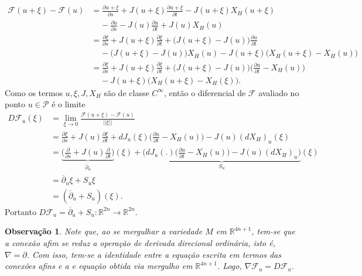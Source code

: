 \documentclass[12pt]{book}
\newtheorem{observacao}[teorema]{Observação}
\newcommand{\bigparenteses}[1]{\Big( #1 \Big) }
\newcommand{\caminhosexponenciaisconectantesabrev}{\mathcal{P}}
\newcommand{\campohamiltoniano}[1]{X_{H}(#1)}
\newcommand{\diferencialfloer}{D\operadorFloer}
\newcommand{\derivadaparcial}[2]{\frac{\partial #1}{\partial #2}}
\newcommand{\diferencialhamiltoniano}[1]{(dX_{H})_{#1}}
\newcommand{\operadorFloer}{\mathcal{F}}
\newcommand{\operadorFloerDefinicao}[1]{\derivadaparcial{#1}{s} + J(#1)\derivadaparcial{#1}{t} - J(#1)X_{H}(#1)}
\newcommand{\operadorFloerParametro}[1]{\mathcal{F}(#1)}
\newcommand{\norma}[1]{||#1||}
\newcommand{\operadorcauchyabrev}[1]{\overline{\partial}_{#1}}
\newcommand{\real}[1]{\mathbb{R}^{#1}}
\begin{document}
	$$
	\begin{aligned}
	\operadorFloerParametro{u+\xi}-\operadorFloerParametro{u}
	&= \operadorFloerDefinicao{u+\xi}
	\\
	&\;\;\;\; -\derivadaparcial{u}{s} - J(u)\derivadaparcial{u}{t} + J(u)\campohamiltoniano{u}
	\\
	&=\derivadaparcial{\xi}{s}+J(u+\xi)\derivadaparcial{\xi}{t}+\bigparenteses{J(u+\xi)-J(u)}\derivadaparcial{u}{t}
	\\
	&\;\;\;\;-\bigparenteses{J(u+\xi)-J(u)}\campohamiltoniano{u} 
	-J(u+\xi)\bigparenteses{\campohamiltoniano{u+\xi}-\campohamiltoniano{u}}
	\\
	&=\derivadaparcial{\xi}{s} + J(u+\xi)\derivadaparcial{\xi}{t} + \bigparenteses{J(u+\xi)-J(u)}\bigparenteses{\derivadaparcial{u}{t} - X_{H}(u)}  
	\\
	&\;\;\;\; -J(u+\xi)\bigparenteses{X_{H}(u+\xi) - X_{H}(\xi)}.
	\end{aligned}
	$$
	Como os termos $u, \xi, J, X_{H}$ são de classe $C^{\infty}$, então o diferencial de $\operadorFloer$ avaliado no ponto $u\in \caminhosexponenciaisconectantesabrev$ é o limite 
	$$
	\begin{aligned}
	\diferencialfloer_{u}(\xi)
	&=\lim_{\xi \to 0} \frac{	\operadorFloerParametro{u+\xi}-\operadorFloerParametro{u}}{\norma{\xi}}
	\\
	&= \derivadaparcial{\xi}{s} + J(u)\derivadaparcial{\xi}{t}+ dJ_{u}(\xi)\bigparenteses{\derivadaparcial{u}{t} - X_{H}(u)} - J(u) \diferencialhamiltoniano{u}(\xi)
	\\
	&= \underbrace{\Big( \derivadaparcial{}{s} + J(u)\derivadaparcial {}{t}\Big)}_{\overline{\partial}_{u}}(\xi)+ \underbrace{\Big(dJ_{u}(.)\bigparenteses{\derivadaparcial{u}{t} - X_{H}(u)} - J(u) \diferencialhamiltoniano{u}\Big)}_{S_{u}}(\xi)
	\\
	&= \operadorcauchyabrev{u} \xi + S_{u}\xi
	\\
	&= (\operadorcauchyabrev{u}  + S_{u})(\xi).
	\end{aligned}
	$$
	Portanto $ D\operadorFloer_{u}= \operadorcauchyabrev{u}  + S_{u}: \real{2n} \to \real{2n}$.
	
	\begin{observacao}
		Note que, ao se mergulhar a variedade $M$ em $\real{4n+1}$, tem-se que a conexão afim se reduz a operação de derivada direcional ordinária, isto é,  $\nabla=\partial$. Com isso, tem-se a identidade entre a equação escrita em termos das conexões afins e a e equação obtida via mergulho em $\real{4n+1}$. Logo, $\nabla\operadorFloer_{u} = \diferencialfloer_{u}$.
	\end{observacao}
\end{document}
